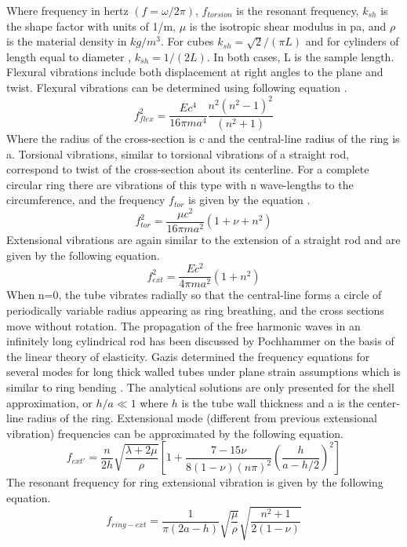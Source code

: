 \begin{doublespacing}
Where frequency in hertz $(f=\omega/2\pi)$, $f_{torsion}$ is the resonant frequency, $k_{sh}$ is the shape factor with units of 1/m, $\mu$ is the isotropic shear modulus in pa, and $\rho$ is the material density in $kg/m^3$. For cubes \cite{demarest1971cube} $k_{sh} = \sqrt{2}/(\pi L)$ and for cylinders of length equal to diameter \cite{heyliger1993elastic}, $k_{sh}=1/(2L)$. In both cases, L is the sample length. Flexural vibrations include both displacement at right angles to the plane and twist. Flexural vibrations can be determined using following equation \cite{love2013treatise}.
\begin{equation}
f_{flex}^2 =  \frac{Ec^4}{16 \pi ma^4} \frac{n^2(n^2-1)^2}{(n^2+1)}
\end{equation}
Where the radius of the cross-section is c and the central-line radius of the ring is a. Torsional vibrations, similar to torsional vibrations of a straight rod, correspond to twist of the cross-section about its centerline. For a complete circular ring there are vibrations of this type with n wave-lengths to the circumference, and the frequency $f_{tor}$ is given by the equation \cite{love2013treatise}.
\begin{equation}
f_{tor}^2 = \frac{\mu c^2}{16\pi ma^2} (1 + \nu + n^2)
\end{equation}
Extensional vibrations are again similar to the extension of a straight rod and are given by the following equation.
\begin{equation}
f_{ext}^2 = \frac{Ec^2}{4 \pi ma^2}(1+n^2)
\end{equation}
When n=0, the tube vibrates radially so that the central-line forms a circle of periodically variable radius appearing as ring breathing, and the cross sections move without rotation. The propagation of the free harmonic waves in an infinitely long cylindrical rod has been discussed by Pochhammer \cite{pochhammer1876ueber} on the basis of the linear theory of elasticity. Gazis determined the frequency equations for several modes for long thick walled tubes under plane strain assumptions which is similar to ring bending \cite{gazis1958exact}. The analytical solutions are only presented for the shell approximation, or $ h/a \ll 1$ where $h$ is the tube wall thickness and a is the center-line radius of the ring. Extensional mode (different from previous extensional vibration) frequencies can be approximated by the following equation.
\begin{equation}
f_{ext'} = \frac{n}{2h} \sqrt{\frac{\lambda+2\mu}{\rho}}\left[1+ \frac{7-15\nu}{8(1-\nu)(n\pi)^2}\left(\frac{h}{a-h/2}\right)^2 \right]
\end{equation}
The resonant frequency for ring extensional vibration is given by the following equation.
\begin{equation}
f_{ring-ext} = \frac{1}{\pi(2a-h)} \sqrt{\frac{\mu}{\rho}}\sqrt{\frac{n^2+1}{2(1-\nu)}}
\end{equation}


\end{doublespacing}

